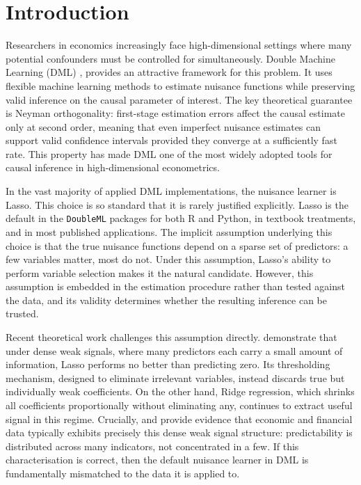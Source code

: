 \documentclass[a4paper,10.5pt]{article}
\begin{document}
\section{Introduction}\label{sec:intro}

Researchers in economics increasingly face high-dimensional settings where many potential confounders must be controlled for simultaneously. Double Machine Learning (DML) \citep{chernozhukov2018}, provides an attractive framework for this problem. It uses flexible machine learning methods to estimate nuisance functions while preserving valid inference on the causal parameter of interest. The key theoretical guarantee is Neyman orthogonality: first-stage estimation errors affect the causal estimate only at second order, meaning that even imperfect nuisance estimates can support valid confidence intervals provided they converge at a sufficiently fast rate. This property has made DML one of the most widely adopted tools for causal inference in high-dimensional econometrics.

In the vast majority of applied DML implementations, the nuisance learner is Lasso. This choice is so standard that it is rarely justified explicitly. Lasso is the default in the \texttt{DoubleML} packages for both R and Python, in textbook treatments, and in most published applications. The implicit assumption underlying this choice is that the true nuisance functions depend on a sparse set of predictors: a few variables matter, most do not. Under this assumption, Lasso's ability to perform variable selection makes it the natural candidate. However, this assumption is embedded in the estimation procedure rather than tested against the data, and its validity determines whether the resulting inference can be trusted.

Recent theoretical work challenges this assumption directly. \citet{shenxiu2025} demonstrate that under dense weak signals, where many predictors each carry a small amount of information, Lasso performs no better than predicting zero. Its thresholding mechanism, designed to eliminate irrelevant variables, instead discards true but individually weak coefficients. On the other hand, Ridge regression, which shrinks all coefficients proportionally without eliminating any, continues to extract useful signal in this regime. Crucially, \citet{giannone2021} and \citet{gu2020} provide evidence that economic and financial data typically exhibits precisely this dense weak signal structure: predictability is distributed across many indicators, not concentrated in a few. If this characterisation is correct, then the default nuisance learner in DML is fundamentally mismatched to the data it is applied to.
\end{document}

